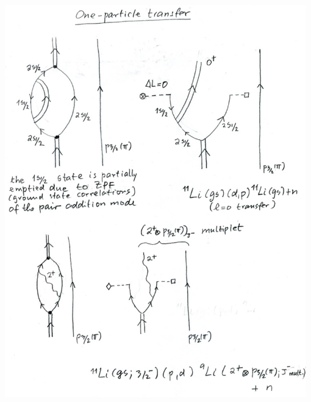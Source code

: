 \documentclass[a4paper,onecolumn,superscriptaddress,12pt,nofootinbib,twoside,raggedfooter,notitlepage]{revtex4-1}
\begin{document}
\begin{center}
	\includegraphics[width=0.98\textwidth]{figs/fig_c4}
\end{center}
\end{document}
